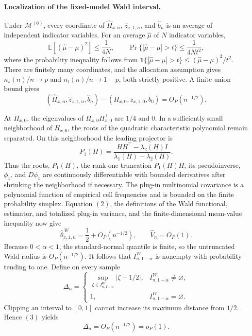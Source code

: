 \paragraph{Localization of the fixed-model Wald interval.}
Under \(\mathcal M^{(0)}\), every coordinate of
\(\widehat H_{x,n}\), \(\widehat z_{x,1,n}\), and \(\widehat b_n\) is an average of independent indicator variables. For an average \(\widehat\mu\) of \(N\) indicator variables,
\[
\mathbb E[(\widehat\mu-\mu)^2]\le\frac1{4N},
\qquad
\Pr\{|\widehat\mu-\mu|>t\}
\le\frac1{4Nt^2},
\]
where the probability inequality follows from
\(\mathbf 1\{|\widehat\mu-\mu|>t\}\le
(\widehat\mu-\mu)^2/t^2\).
There are finitely many coordinates, and the allocation assumption gives
\(n_s(n)/n\to p\) and \(n_t(n)/n\to1-p\), both strictly positive. A finite union bound gives
\[
(\widehat H_{x,n},\widehat z_{x,1,n},\widehat b_n)
-(H_{x,0},z_{x,1,0},b_0)=O_P(n^{-1/2}). \tag{2}
\]

At \(H_{x,0}\), the eigenvalues of
\(H_{x,0}H_{x,0}^{\top}\) are \(1/4\) and \(0\). In a sufficiently small neighborhood of \(H_{x,0}\), the roots of the quadratic characteristic polynomial remain separated. On this neighborhood the leading projector is
\[
P_1(H)=
\frac{HH^{\top}-\lambda_2(H)I}
{\lambda_1(H)-\lambda_2(H)}.
\]
Thus the roots, \(P_1(H)\), the rank-one truncation \(P_1(H)H\), its pseudoinverse, \(\phi_1\), and \(D\phi_1\) are continuously differentiable with bounded derivatives after shrinking the neighborhood if necessary. The plug-in multinomial covariance is a polynomial function of empirical cell frequencies and is bounded on the finite probability simplex. Equation \((2)\), the definitions of the Wald functional, estimator, and totalized plug-in variance, and the finite-dimensional mean-value inequality now give
\[
\widehat\theta^{\,W}_{x,1,n}
=\frac12+O_P(n^{-1/2}),
\qquad
\widehat V_n=O_P(1). \tag{3}
\]
Because \(0<\alpha<1\), the standard-normal quantile is finite, so the untruncated Wald radius is \(O_P(n^{-1/2})\). It follows that
\(I^W_{n,1-\alpha}\) is nonempty with probability tending to one. Define on every sample
\[
\Delta_n=
\begin{cases}
\displaystyle
\sup_{\zeta\in I^W_{n,1-\alpha}}|\zeta-1/2|,
&I^W_{n,1-\alpha}\ne\varnothing,\\
1,&I^W_{n,1-\alpha}=\varnothing.
\end{cases}
\]
Clipping an interval to \([0,1]\) cannot increase its maximum distance from \(1/2\). Hence \((3)\) yields
\[
\Delta_n=O_P(n^{-1/2})=o_P(1). \tag{4}
\]

